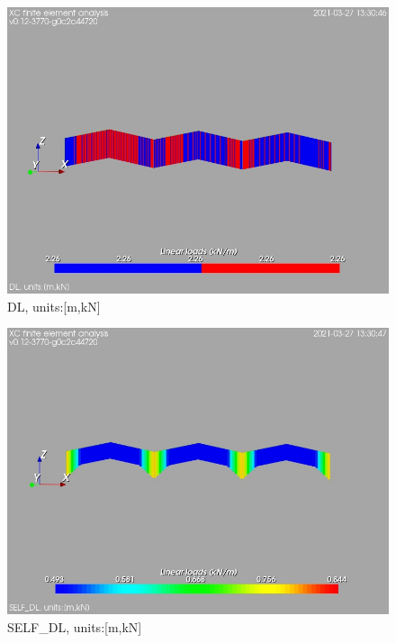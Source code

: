 \begin{figure}
\begin{center}
\includegraphics[width=\linewidth]{calc_results/sole_zeinali/text/graphics/loads/DLallMemberSet}
\caption{DL, units:[m,kN]}
\label{dl-unitsmkn}
\end{center}
\end{figure}
\begin{figure}
\begin{center}
\includegraphics[width=\linewidth]{calc_results/sole_zeinali/text/graphics/loads/SELF_DLallMemberSet}
\caption{SELF_DL, units:[m,kN]}
\label{self-dl-unitsmkn}
\end{center}
\end{figure}
